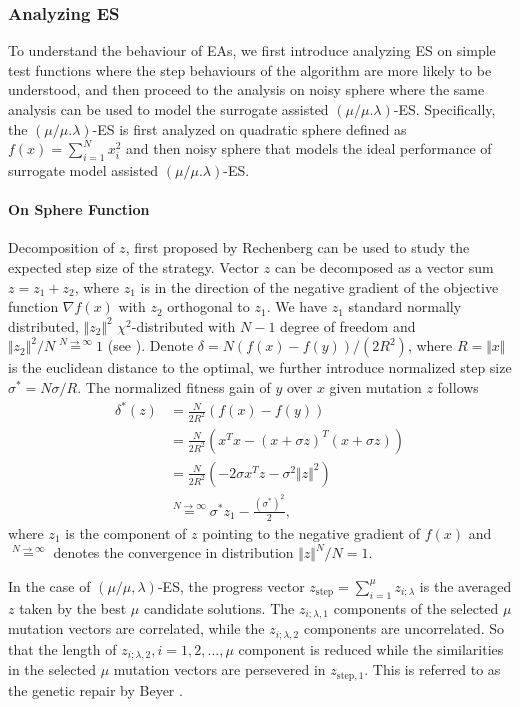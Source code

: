\subsubsection{Analyzing ES}\label{sssec:analysis_sphere_combined}\hfill

To understand the behaviour of EAs, we first introduce analyzing ES on simple test functions where the step behaviours of the algorithm are more likely to be understood, and then proceed to the analysis on noisy sphere where the same analysis can be used to model the surrogate assisted $(\mu/\mu.\lambda)$-ES. Specifically, the $(\mu/\mu.\lambda)$-ES is first analyzed on quadratic sphere defined as $f(x) = \sum_{i=1}^N x_i^2$ and then noisy sphere that models the ideal performance of surrogate model assisted $(\mu/\mu.\lambda)$-ES.


\paragraph{On Sphere Function}
Decomposition of $z$, first proposed by Rechenberg \cite{Rechenberg1973} can be used to study the expected step size of the strategy. Vector $z$ can be decomposed as a vector sum $z = z_1 + z_2$, where $z_1$ is in the direction of the negative gradient of the objective function $\nabla f(x)$ with $z_2$ orthogonal to $z_1$. We have $z_1$ standard normally distributed, $\Vert z_2\Vert^2$ $\chi^2$-distributed with $N-1$ degree of freedom and $ \Vert z_2\Vert^2 /N \overset{N \rightarrow \infty }{=} 1$ (see \cite{beyer2013theory}). Denote $\delta = N (f(x) - f(y))/(2R^2)$, where $R = \Vert x \Vert$ is the euclidean distance to the optimal, we further introduce normalized step size $\sigma^* = N \sigma/R$. The normalized fitness gain of $y$ over $x$ given mutation $z$ follows
\begin{align}{}
\delta^*(z) & = \frac{N}{2R^2}\left( f(x) - f(y)\right)  \nonumber\\
& = \frac{N}{2R^2} (x^Tx - (x+\sigma z)^T (x+\sigma z)) \nonumber\\
& = \frac{N}{2R^2} (-2 \sigma x^Tz - \sigma^2 \Vert z \Vert^2 ) \nonumber\\
& \overset{N \rightarrow \infty}{=} \sigma^* z_{1} - \frac{(\sigma^*) ^2}{2} \label{eqn:delta_z}{},
\end{align}
where $z_{1}$ is the component of $z$ pointing to the negative gradient of $f(x)$ and $\overset{ N \rightarrow \infty}{=}$ denotes the convergence in distribution $\Vert z \Vert^N/N = 1$. 


In the case of $(\mu/\mu,\lambda)$-ES, the progress vector $z_{\text{step}} = \sum_{i=1}^\mu z_{i;\lambda}$ is the averaged $z$ taken by the best $\mu$ candidate solutions. The $z_{i;\lambda,1}$ components of the selected $\mu$ mutation vectors are correlated, while the $z_{i;\lambda,2}$ components are uncorrelated. So that the length of $z_{i;\lambda,2},i=1,2,...,\mu$ component is reduced while the similarities in the selected $\mu$ mutation vectors are persevered in $z_{\text{step},1}$. This is referred to as the genetic repair by Beyer \cite{Beyer:1995:TTE:1326683.1326688}. 


